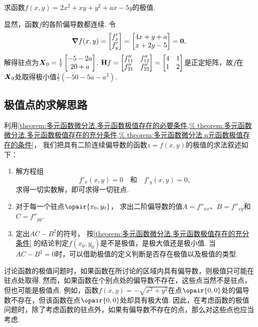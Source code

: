\begin{example}
求函数\(f(x,y) = 2x^2 + xy + y^2 + ax - 5y\)的极值.
\begin{solution}
显然，函数\(f\)的各阶偏导数都连续.
令\[
\grad f(x,y) = \begin{bmatrix} f'_x \\ f'_y \end{bmatrix}
= \begin{bmatrix} 4x+y+a \\ x+2y-5 \end{bmatrix} = \boldsymbol{0},
\]解得驻点为\(\boldsymbol{X}_{0} = \frac{1}{7} \begin{bmatrix} -5-2a \\ 20+a \end{bmatrix}\).
\(\boldsymbol{\operatorname{H}} f = \begin{bmatrix}
f''_{11} & f''_{12} \\
f''_{21} & f''_{22}
\end{bmatrix} = \begin{bmatrix}
4 & 1 \\
1 & 2
\end{bmatrix}\)是正定矩阵，故\(f\)在\(\boldsymbol{X}_{0}\)处取得极小值\(\frac{1}{7} (-50-5a-a^2)\).
\end{solution}
\end{example}

\subsection{极值点的求解思路}
利用\cref{theorem:多元函数微分法.多元函数极值存在的必要条件,%
theorem:多元函数微分法.多元函数极值存在的充分条件,%
theorem:多元函数微分法.n元函数极值存在的条件}，
我们把具有二阶连续偏导数的函数\(z = f(x,y)\)的极值的求法叙述如下：
\begin{enumerate}
	\item 解方程组\[
		f'_x(x,y) = 0
		\quad\text{和}\quad
		f'_y(x,y) = 0,
	\]求得一切实数解，即可求得一切驻点.

	\item 对于每一个驻点\(\opair{x_0,y_0}\)，
	求出二阶偏导数的值\(A=f''_{xx}\)、\(B=f''_{xy}\)和\(C=f''_{yy}\).

	\item 定出\(AC-B^2\)的符号，
	按\cref{theorem:多元函数微分法.多元函数极值存在的充分条件} 的结论判定\(f(x_0,y_0)\)是不是极值，是极大值还是极小值.
	当\(AC-B^2=0\)时，可以借助极值的定义判断是否存在极值以及极值的类型.
\end{enumerate}

讨论函数的极值问题时，如果函数在所讨论的区域内具有偏导数，则极值只可能在驻点处取得.
然而，如果函数在个别点处的偏导数不存在，这些点当然不是驻点，但也可能是极值点.
例如，函数\(f(x,y) = -\sqrt{x^2+y^2}\)在点\(\opair{0,0}\)处的偏导数不存在，但该函数在点\(\opair{0,0}\)处却具有极大值.
因此，在考虑函数的极值问题时，除了考虑函数的驻点外，如果有偏导数不存在的点，那么对这些点也应当考虑.

